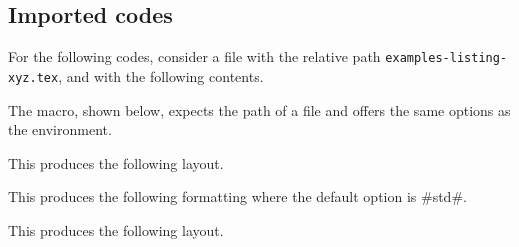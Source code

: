 \documentclass[10pt, a4paper]{tutodoc}
\begin{document}
\subsection{Imported codes}

For the following codes, consider a file with the relative path \verb+examples-listing-xyz.tex+, and with the following contents.


\medskip

The  macro, shown below, expects the path of a file and offers the same options as the  environment.




\begin{tdocexa}
    \leavevmode

    \begin{tdoclatex}[code]
    \end{tdoclatex}

    This produces the following layout.

\end{tdocexa}




\begin{tdocexa}[Following]
    \leavevmode

    \begin{tdoclatex}[code]
    \end{tdoclatex}

    This produces the following formatting where the default option is \tdocinlatex#std#.

\end{tdocexa}




\begin{tdocexa}
    \leavevmode

    \begin{tdoclatex}[code]
    \end{tdoclatex}

    This produces the following layout.

\end{tdocexa}
\end{document}
